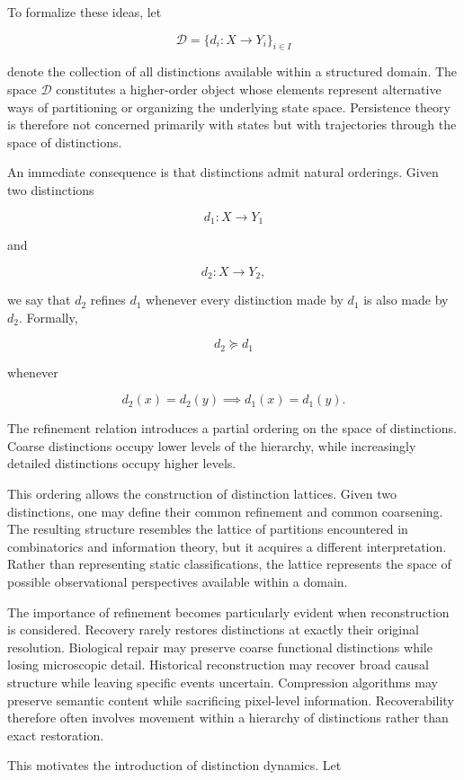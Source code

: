 \documentclass[12pt,oneside]{article}
\theoremstyle{definition}
\begin{document}
To formalize these ideas, let

\[
\mathcal D
=
\{d_i:X\rightarrow Y_i\}_{i\in I}
\]

denote the collection of all distinctions available within a structured domain. The space \(\mathcal D\) constitutes a higher-order object whose elements represent alternative ways of partitioning or organizing the underlying state space. Persistence theory is therefore not concerned primarily with states but with trajectories through the space of distinctions.

An immediate consequence is that distinctions admit natural orderings. Given two distinctions

\[
d_1:X\rightarrow Y_1
\]

and

\[
d_2:X\rightarrow Y_2,
\]

we say that \(d_2\) refines \(d_1\) whenever every distinction made by \(d_1\) is also made by \(d_2\). Formally,

\[
d_2 \succeq d_1
\]

whenever

\[
d_2(x)=d_2(y)
\implies
d_1(x)=d_1(y).
\]

The refinement relation introduces a partial ordering on the space of distinctions. Coarse distinctions occupy lower levels of the hierarchy, while increasingly detailed distinctions occupy higher levels.

This ordering allows the construction of distinction lattices. Given two distinctions, one may define their common refinement and common coarsening. The resulting structure resembles the lattice of partitions encountered in combinatorics and information theory, but it acquires a different interpretation. Rather than representing static classifications, the lattice represents the space of possible observational perspectives available within a domain.

The importance of refinement becomes particularly evident when reconstruction is considered. Recovery rarely restores distinctions at exactly their original resolution. Biological repair may preserve coarse functional distinctions while losing microscopic detail. Historical reconstruction may recover broad causal structure while leaving specific events uncertain. Compression algorithms may preserve semantic content while sacrificing pixel-level information. Recoverability therefore often involves movement within a hierarchy of distinctions rather than exact restoration.

This motivates the introduction of distinction dynamics. Let
\end{document}
